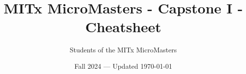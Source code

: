 \documentclass[10pt,landscape,a4paper]{article}
\author{Students of the MITx MicroMasters}%
\title{MITx MicroMasters - Capstone I - Cheatsheet}%
\date{Fall 2024 --- Updated \today}
\begin{document}
\raggedright
\footnotesize






\end{document}
